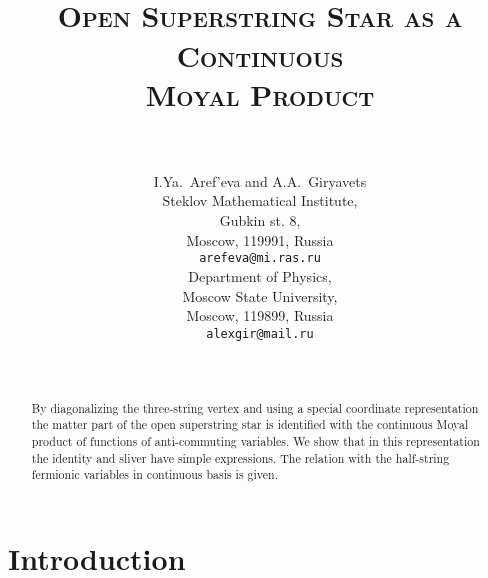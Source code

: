 \documentclass[a4paper,12pt]{article}
\begin{document}
\title{
\myHighlight{$~$}\coordHE{}\\
\textsc{Open Superstring Star as a Continuous}
\\
\textsc{Moyal Product}
\myHighlight{$~$}\coordHE{}\\
\myHighlight{$~$}\coordHE{}\\}
\author{
\textsf{I.Ya.~Aref'eva and A.A.~Giryavets}
\vspace{5mm}
\\
Steklov Mathematical Institute,
\\
Gubkin st. 8,\\
Moscow, 119991, Russia
\vspace{1mm}
\\
\texttt{arefeva@mi.ras.ru}
\vspace{6mm}
\\
Department of Physics,\\
Moscow State University,\\
Moscow, 119899, Russia
\vspace{1mm}
\\
\texttt{alexgir@mail.ru} }

\date{~}
\maketitle
\thispagestyle{empty}

\begin{abstract}
By  diagonalizing  the three-string vertex
and using  a special coordinate representation the matter part of
the open superstring star is identified with the
continuous Moyal product of functions of anti-commuting variables.
We show that in this representation the identity and sliver
have simple expressions. The relation with the half-string fermionic
variables in continuous basis is given.
\end{abstract}


\newpage
\tableofcontents

\section{Introduction}
\label{sec:intro}
\setcounter{equation}{0}
\end{document}
